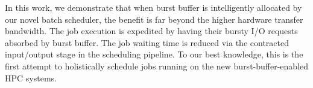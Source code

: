 In this work, we demonstrate that when burst buffer is intelligently allocated 
by our novel batch scheduler, the benefit is far beyond the higher hardware transfer bandwidth.
The job execution is expedited by having their bursty I/O requests absorbed by burst buffer.
The job waiting time is reduced via the contracted input/output stage in the scheduling pipeline.
To our best knowledge, this is the first attempt to holistically schedule jobs
running on the new burst-buffer-enabled HPC systems.



